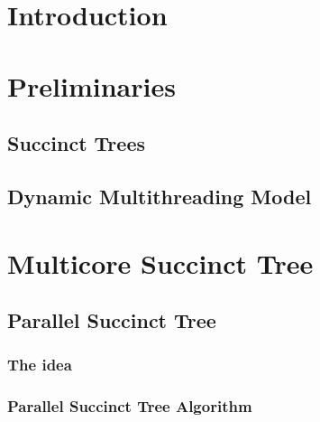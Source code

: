 \documentclass[runningheads]{llncs}
\begin{document}
\section{Introduction}
\label{sec:introduction}




\section{Preliminaries}
\label{sec:relwork}


\subsection{Succinct Trees}
\label{subsec:suctrees}


\subsection{Dynamic Multithreading Model}
\label{subsec:dym}


%


\section{Multicore Succinct Tree}
\label{sec:multicoreST}


\subsection{Parallel Succinct Tree}
\label{sec:PST}

\subsubsection{The idea}
\label{subsec:idea}


\subsubsection{Parallel Succinct Tree Algorithm}
\label{subsec:multicoreSTAlgorithm}

\end{document}
